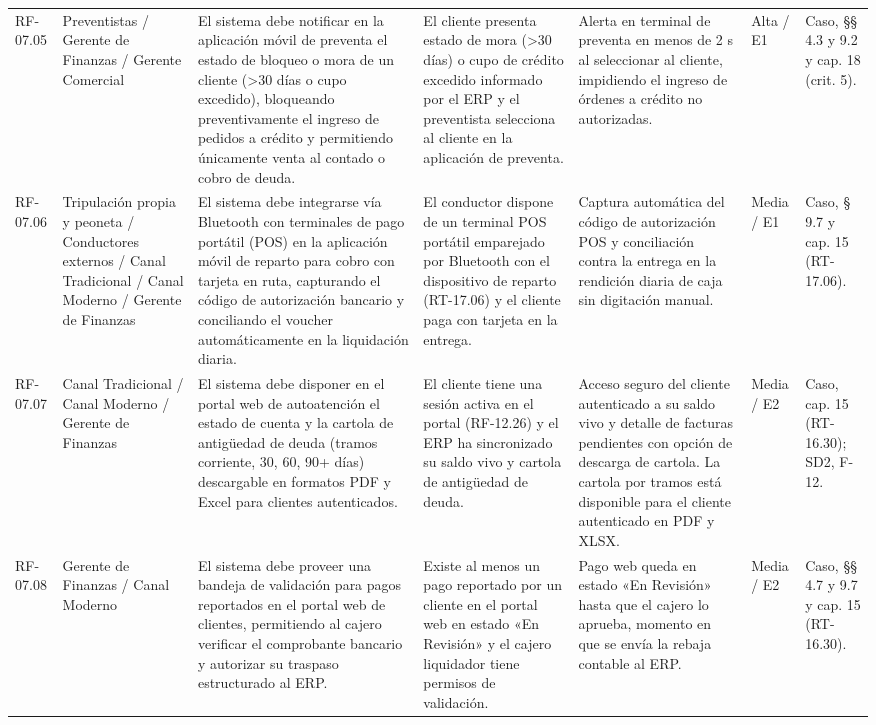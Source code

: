 {\begin{longtable}{@{}F{0.062} F{0.080} F{0.195} F{0.160} F{0.240} F{0.093} F{0.170}@{}}
  RF-07.05 & Preventistas / Gerente de Finanzas / Gerente Comercial & El sistema debe notificar en la aplicación móvil de preventa el estado de bloqueo o mora de un cliente (>30 días o cupo excedido), bloqueando preventivamente el ingreso de pedidos a crédito y permitiendo únicamente venta al contado o cobro de deuda. & El cliente presenta estado de mora (>30 días) o cupo de crédito excedido informado por el ERP y el preventista selecciona al cliente en la aplicación de preventa. & Alerta en terminal de preventa en menos de 2 s al seleccionar al cliente, impidiendo el ingreso de órdenes a crédito no autorizadas. & Alta / E1 & Caso, §§ 4.3 y 9.2 y cap. 18 (crit. 5). \\
  RF-07.06 & Tripulación propia y peoneta / Conductores externos / Canal Tradicional / Canal Moderno / Gerente de Finanzas & El sistema debe integrarse vía Bluetooth con terminales de pago portátil (POS) en la aplicación móvil de reparto para cobro con tarjeta en ruta, capturando el código de autorización bancario y conciliando el voucher automáticamente en la liquidación diaria. & El conductor dispone de un terminal POS portátil emparejado por Bluetooth con el dispositivo de reparto (RT-17.06) y el cliente paga con tarjeta en la entrega. & Captura automática del código de autorización POS y conciliación contra la entrega en la rendición diaria de caja sin digitación manual. & Media / E1 & Caso, § 9.7 y cap. 15 (RT-17.06). \\
  RF-07.07 & Canal Tradicional / Canal Moderno / Gerente de Finanzas & El sistema debe disponer en el portal web de autoatención el estado de cuenta y la cartola de antigüedad de deuda (tramos corriente, 30, 60, 90+ días) descargable en formatos PDF y Excel para clientes autenticados. & El cliente tiene una sesión activa en el portal (RF-12.26) y el ERP ha sincronizado su saldo vivo y cartola de antigüedad de deuda. & Acceso seguro del cliente autenticado a su saldo vivo y detalle de facturas pendientes con opción de descarga de cartola. La cartola por tramos está disponible para el cliente autenticado en PDF y XLSX. & Media / E2 & Caso, cap. 15 (RT-16.30); SD2, F-12. \\
  RF-07.08 & Gerente de Finanzas / Canal Moderno & El sistema debe proveer una bandeja de validación para pagos reportados en el portal web de clientes, permitiendo al cajero verificar el comprobante bancario y autorizar su traspaso estructurado al ERP. & Existe al menos un pago reportado por un cliente en el portal web en estado «En Revisión» y el cajero liquidador tiene permisos de validación. & Pago web queda en estado «En Revisión» hasta que el cajero lo aprueba, momento en que se envía la rebaja contable al ERP. & Media / E2 & Caso, §§ 4.7 y 9.7 y cap. 15 (RT-16.30). \\

\end{longtable}}

